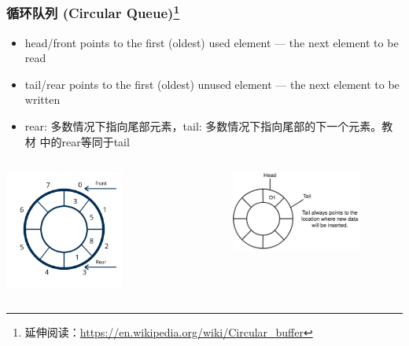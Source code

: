 \begin{frame}[fragile]
  \frametitle{循环队列 (Circular Queue)\footnote{延伸阅读：\url{https://en.wikipedia.org/wiki/Circular\_buffer}
  }}
  \small
  \begin{itemize}
  \item head/front points to the first (oldest) used element --- the next element to be read
  \item tail/rear points to the first (oldest) unused element --- the next element to be written
  \item rear: 多数情况下指向尾部元素，tail: 多数情况下指向尾部的下一个元素。教材
    中的rear等同于tail
  \end{itemize}

  \begin{columns}
    \begin{column}[T]{0.5\linewidth}
      \includegraphics[width=0.55\textwidth]{figs/stack/circular-queue-1.png}
    \end{column}
    \begin{column}[T]{0.5\linewidth}
      \includegraphics[width=0.75\textwidth]{figs/stack/circular-queue-2.png}
    \end{column}
  \end{columns}
\end{frame}

